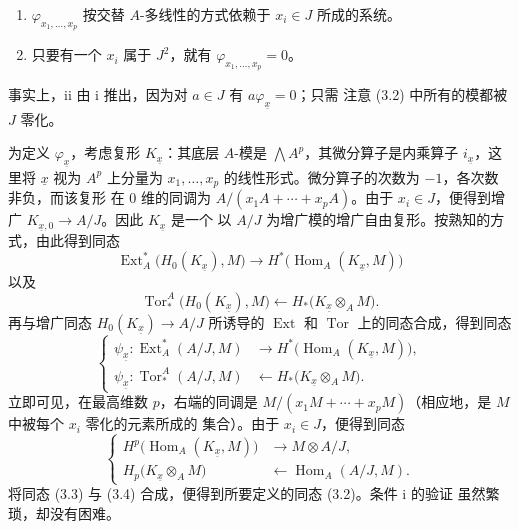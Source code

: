 \begin{enumerate}
\item[\textup{i.}] $\varphi_{x_1,\ldots,x_p}$ 按交替 $A$-多线性的方式依赖于
$x_i\in J$ 所成的系统。
\item[\textup{ii.}] 只要有一个 $x_i$ 属于 $J^{2}$，就有
$\varphi_{x_1,\ldots,x_p}=0$。
\end{enumerate}
事实上，ii 由 i 推出，因为对 $a\in J$ 有 $a\varphi_{\underline{x}}=0$；只需
注意 (3.2) 中所有的模都被 $J$ 零化。

为定义 $\varphi_{\underline{x}}$，考虑复形 $K_{\underline{x}}$：其底层
$A$-模是 $\bigwedge A^{p}$，其微分算子是内乘算子
$i_{\underline{x}}$，这里将 $\underline{x}$ 视为 $A^{p}$ 上分量为
$x_1,\ldots,x_p$ 的线性形式。微分算子的次数为 $-1$，各次数非负，而该复形
在 $0$ 维的同调为 $A/(x_1A+\cdots+x_pA)$。由于 $x_i\in J$，便得到增广
$K_{\underline{x},0}\longrightarrow A/J$。因此 $K_{\underline{x}}$ 是一个
以 $A/J$ 为增广模的增广自由复形。按熟知的方式，由此得到同态
\[
\operatorname{Ext}_{A}^{*}\bigl(H_0(K_{\underline{x}}),M\bigr)
\longrightarrow
H^{*}\bigl(\operatorname{Hom}_{A}(K_{\underline{x}},M)\bigr)
\]
以及
\[
\operatorname{Tor}_{*}^{A}\bigl(H_0(K_{\underline{x}}),M\bigr)
\longleftarrow
H_{*}\bigl(K_{\underline{x}}\otimes_A M\bigr).
\]
再与增广同态 $H_0(K_{\underline{x}})\longrightarrow A/J$ 所诱导的
$\operatorname{Ext}$ 和 $\operatorname{Tor}$ 上的同态合成，得到同态
\begin{equation}\tag{3.3}
\left\{
\begin{aligned}
\psi_{\underline{x}}:
\operatorname{Ext}_{A}^{*}(A/J,M)
&\longrightarrow H^{*}\bigl(\operatorname{Hom}_{A}(K_{\underline{x}},M)\bigr),\\
\psi_{\underline{x}}:
\operatorname{Tor}_{*}^{A}(A/J,M)
&\longleftarrow H_{*}\bigl(K_{\underline{x}}\otimes_A M\bigr).
\end{aligned}
\right.
\end{equation}
立即可见，在最高维数 $p$，右端的同调是
$M/(x_1M+\cdots+x_pM)$（相应地，是 $M$ 中被每个 $x_i$ 零化的元素所成的
集合）。由于 $x_i\in J$，便得到同态
\begin{equation}\tag{3.4}
\left\{
\begin{aligned}
H^{p}\bigl(\operatorname{Hom}_{A}(K_{\underline{x}},M)\bigr)
&\longrightarrow M\otimes A/J,\\
H_{p}\bigl(K_{\underline{x}}\otimes_A M\bigr)
&\longleftarrow\operatorname{Hom}_{A}(A/J,M).
\end{aligned}
\right.
\end{equation}
将同态 (3.3) 与 (3.4) 合成，便得到所要定义的同态 (3.2)。条件 i 的验证
虽然繁琐，却没有困难。

